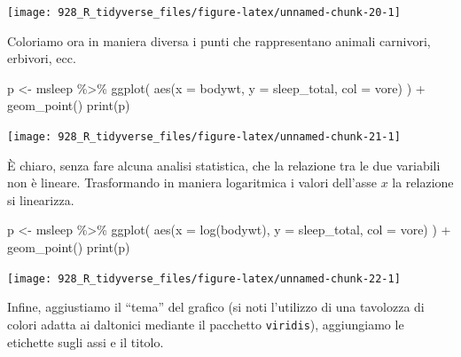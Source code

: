 \documentclass[
  10pt,
  italian,
  a4paper,
  extrafontsizes,onecolumn,openright
  ]{memoir}
\newenvironment{Shaded}{\begin{snugshade}}{\end{snugshade}}
\newcommand{\AttributeTok}[1]{\textcolor[rgb]{0.77,0.63,0.00}{#1}}
\newcommand{\FunctionTok}[1]{\textcolor[rgb]{0.00,0.00,0.00}{#1}}
\newcommand{\NormalTok}[1]{#1}
\newcommand{\OtherTok}[1]{\textcolor[rgb]{0.56,0.35,0.01}{#1}}
\newcommand{\SpecialCharTok}[1]{\textcolor[rgb]{0.00,0.00,0.00}{#1}}
\begin{document}
\begin{center}\texttt{[image: 928\_R\_tidyverse\_files/figure-latex/unnamed-chunk-20-1]} \end{center}

Coloriamo ora in maniera diversa i punti che rappresentano animali carnivori, erbivori, ecc.

\begin{Shaded}
\begin{Highlighting}[]
\NormalTok{p }\OtherTok{\textless{}{-}}\NormalTok{ msleep }\SpecialCharTok{\%\textgreater{}\%} 
  \FunctionTok{ggplot}\NormalTok{(}
    \FunctionTok{aes}\NormalTok{(}\AttributeTok{x =}\NormalTok{ bodywt, }\AttributeTok{y =}\NormalTok{ sleep\_total, }\AttributeTok{col =}\NormalTok{ vore)}
\NormalTok{  ) }\SpecialCharTok{+}
  \FunctionTok{geom\_point}\NormalTok{()}
\FunctionTok{print}\NormalTok{(p)}
\end{Highlighting}
\end{Shaded}

\begin{center}\texttt{[image: 928\_R\_tidyverse\_files/figure-latex/unnamed-chunk-21-1]} \end{center}

È chiaro, senza fare alcuna analisi statistica, che la relazione tra le due variabili non è lineare. Trasformando in maniera logaritmica i valori dell'asse \(x\) la relazione si linearizza.

\begin{Shaded}
\begin{Highlighting}[]
\NormalTok{p }\OtherTok{\textless{}{-}}\NormalTok{ msleep }\SpecialCharTok{\%\textgreater{}\%} 
  \FunctionTok{ggplot}\NormalTok{(}
    \FunctionTok{aes}\NormalTok{(}\AttributeTok{x =} \FunctionTok{log}\NormalTok{(bodywt), }\AttributeTok{y =}\NormalTok{ sleep\_total, }\AttributeTok{col =}\NormalTok{ vore)}
\NormalTok{  ) }\SpecialCharTok{+}
  \FunctionTok{geom\_point}\NormalTok{()}
\FunctionTok{print}\NormalTok{(p)}
\end{Highlighting}
\end{Shaded}

\begin{center}\texttt{[image: 928\_R\_tidyverse\_files/figure-latex/unnamed-chunk-22-1]} \end{center}

Infine, aggiustiamo il ``tema'' del grafico (si noti l'utilizzo di una tavolozza di colori adatta ai daltonici mediante il pacchetto \texttt{viridis}), aggiungiamo le etichette sugli assi e il titolo.
\end{document}
